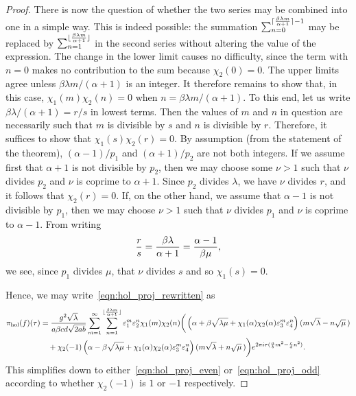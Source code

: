 \documentclass[11pt,reqno]{amsart}
\renewcommand{\=}{\;=\;}
\theoremstyle{myremark}
\begin{document}
\begin{proof}
There is now the question of whether the two series may be combined into one in a simple way. 
This is indeed possible: the summation $\sum_{n=0}^{\lceil {\beta \lambda m \over \alpha+1} \rceil-1}$ may be replaced by $\sum_{n=1}^{\lfloor {\beta \lambda m \over \alpha+1} \rfloor}$ in the second series without altering the value of the expression. 
The change in the lower limit causes no difficulty, since the term with $n=0$ makes no contribution to the sum because $\chi_2(0)=0$. 
The upper limits agree unless $\beta\lambda m/(\alpha+1)$ is an integer. 
It therefore remains to show that, in this case, $\chi_1(m)\chi_2(n) = 0$ when $n = \beta\lambda m/(\alpha+1)$. 
To this end, let us write $\beta\lambda/(\alpha+1) = r/s$ in lowest terms. 
Then the values of $m$ and $n$ in question are necessarily such that $m$ is divisible by $s$ and $n$ is divisible by $r$. Therefore, it suffices to show that $\chi_1(s)\chi_2(r)=0$. 
By assumption (from the statement of the theorem), $(\alpha-1)/p_1$ and $(\alpha+1)/p_2$ are not both integers. 
If we assume first that $\alpha+1$ is not divisible by $p_2$, then we may choose some $\nu>1$ such that $\nu$ divides $p_2$ and $\nu$ is coprime to $\alpha+1$. 
Since $p_2$ divides $\lambda$, we have $\nu$ divides $r$, and it follows that $\chi_2(r)=0$. 
If, on the other hand, we assume that $\alpha-1$ is not divisible by $p_1$, then we may choose $\nu>1$ such that $\nu$ divides $p_1$ and $\nu$ is coprime to $\alpha-1$. 
From writing
\[ 
{r \over s} = {\beta\lambda \over \alpha+1} = {\alpha-1 \over \beta\mu}, 
\]
we see, since $p_1$ divides $\mu$, that $\nu$ divides $s$ and so $\chi_1(s)=0$.

Hence, we may write~\eqref{eqn:hol_proj_rewritten} as
{\fontsize{10.2}{10}\selectfont
\begin{align*}
\pi_\text{hol}(f)(\tau) &= {g^2\sqrt{\lambda} \over a\beta cd\sqrt{2ab}} \sum_{m=1}^\infty \sum_{n=1}^{\lfloor {\beta \lambda m \over \alpha+1} \rfloor} \varepsilon_1^m \varepsilon_2^n \chi_1(m) \chi_2(n) \bigg( \left( \alpha + \beta \sqrt{\lambda\mu} + \chi_1(\alpha)\chi_2(\alpha)  \varepsilon_3^m \varepsilon_4^n \right) (m\sqrt{\lambda}- n \sqrt{\mu} \,) \\
&\quad + \chi_2(-1) \left( \alpha - \beta \sqrt{\lambda\mu} + \chi_1(\alpha)\chi_2(\alpha) \varepsilon_3^m \varepsilon_4^n \right) (m\sqrt{\lambda} + n \sqrt{\mu} \,) \bigg) e^{2\pi i \tau ({a \over b} m^2-{c \over d}n^2)}.
\end{align*}
}
This simplifies down to either~\eqref{eqn:hol_proj_even} or~\eqref{eqn:hol_proj_odd} according to whether $\chi_2(-1)$ is $1$ or $-1$ respectively.
\end{proof}
\end{document}
